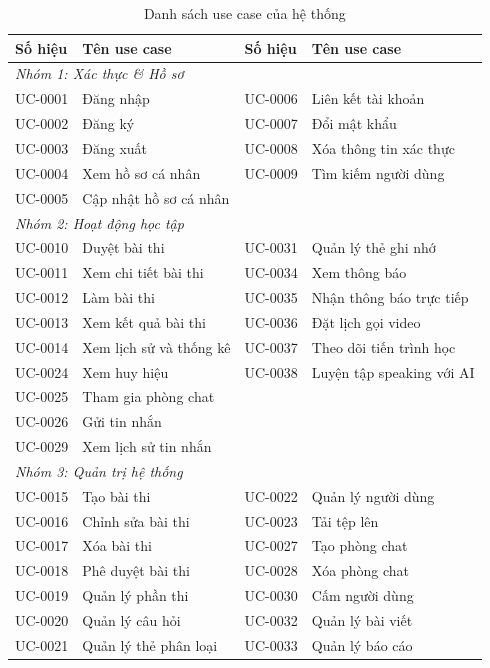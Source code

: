 \begin{table}[H]
\centering
\caption{Danh sách use case của hệ thống}
\label{tab:usecase-summary}
\renewcommand{\arraystretch}{1.15}
\small
\begin{tabular}{|p{1.5cm}|p{6cm}|p{1.5cm}|p{5cm}|}
\hline
\textbf{Số hiệu} & \textbf{Tên use case} & \textbf{Số hiệu} & \textbf{Tên use case} \\
\hline
\multicolumn{4}{|l|}{\textit{Nhóm 1: Xác thực \& Hồ sơ}} \\
\hline
UC-0001 & Đăng nhập & UC-0006 & Liên kết tài khoản \\
UC-0002 & Đăng ký & UC-0007 & Đổi mật khẩu \\
UC-0003 & Đăng xuất & UC-0008 & Xóa thông tin xác thực \\
UC-0004 & Xem hồ sơ cá nhân & UC-0009 & Tìm kiếm người dùng \\
UC-0005 & Cập nhật hồ sơ cá nhân & & \\
\hline
\multicolumn{4}{|l|}{\textit{Nhóm 2: Hoạt động học tập}} \\
\hline
UC-0010 & Duyệt bài thi & UC-0031 & Quản lý thẻ ghi nhớ \\
UC-0011 & Xem chi tiết bài thi & UC-0034 & Xem thông báo \\
UC-0012 & Làm bài thi & UC-0035 & Nhận thông báo trực tiếp \\
UC-0013 & Xem kết quả bài thi & UC-0036 & Đặt lịch gọi video \\
UC-0014 & Xem lịch sử và thống kê & UC-0037 & Theo dõi tiến trình học \\
UC-0024 & Xem huy hiệu & UC-0038 & Luyện tập speaking với AI \\
UC-0025 & Tham gia phòng chat & & \\
UC-0026 & Gửi tin nhắn & & \\
UC-0029 & Xem lịch sử tin nhắn & & \\
\hline
\multicolumn{4}{|l|}{\textit{Nhóm 3: Quản trị hệ thống}} \\
\hline
UC-0015 & Tạo bài thi & UC-0022 & Quản lý người dùng \\
UC-0016 & Chỉnh sửa bài thi & UC-0023 & Tải tệp lên \\
UC-0017 & Xóa bài thi & UC-0027 & Tạo phòng chat \\
UC-0018 & Phê duyệt bài thi & UC-0028 & Xóa phòng chat \\
UC-0019 & Quản lý phần thi & UC-0030 & Cấm người dùng \\
UC-0020 & Quản lý câu hỏi & UC-0032 & Quản lý bài viết \\
UC-0021 & Quản lý thẻ phân loại & UC-0033 & Quản lý báo cáo \\
\hline
\end{tabular}
\end{table}

